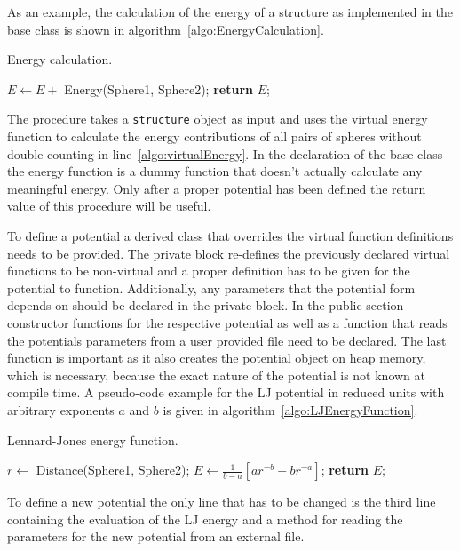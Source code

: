 As an example, the calculation of the energy of a structure as implemented in
the base class is shown in algorithm~\ref{algo:EnergyCalculation}.
%
\begin{algorithm}
    \caption{Energy calculation.}
    \label{algo:EnergyCalculation}
    \begin{algorithmic}[1]
                \State $E\gets E +$ Energy(Sphere1, Sphere2);\label{algo:virtualEnergy}
        \EndFor
        \State \textbf{return} $E$;
        \EndProcedure
    \end{algorithmic}
\end{algorithm}
%
The procedure takes a \verb|structure| object as input and uses the virtual
energy function to calculate the energy contributions of all pairs of spheres
without double counting in line~\ref{algo:virtualEnergy}. In the declaration of
the base class the energy function is a dummy function that doesn't actually
calculate any meaningful energy. Only after a proper potential has been defined
the return value of this procedure will be useful.

To define a potential a derived class that overrides the virtual function
definitions needs to be provided. The private block re-defines the previously
declared virtual functions to be non-virtual and a proper definition has to be
given for the potential to function. Additionally, any parameters that the
potential form depends on should be declared in the private block. In the
public section constructor functions for the respective potential as well as a
function that reads the potentials parameters from a user provided file need to
be declared. The last function is important as it also creates the potential
object on heap memory, which is necessary, because the exact nature of the
potential is not known at compile time. A pseudo-code example for the \ac{LJ}
potential in reduced units with arbitrary exponents $a$ and $b$ is given in
algorithm~\ref{algo:LJEnergyFunction}.
%
\begin{algorithm}
    \caption{Lennard-Jones energy function.}
    \label{algo:LJEnergyFunction}
    \begin{algorithmic}[1]
            \State $r \gets$ Distance(Sphere1, Sphere2);
            \State $E \gets \frac{1}{b-a}\left[ar^{-b}-br^{-a}\right]$;
            \State \textbf{return} $E$;
        \EndProcedure
    \end{algorithmic}
\end{algorithm}
%
To define a new potential the only line that has to be changed is the third
line containing the evaluation of the \ac{LJ} energy and a method for reading
the parameters for the new potential from an external file.

